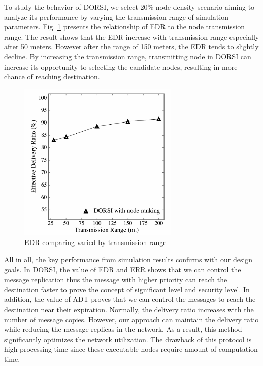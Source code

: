 To study the behavior of DORSI, we select 20\% node density scenario aiming to analyze its performance by varying the transmission range of simulation parameters. 
Fig. \ref{Fig:DORSI:EDR comparing varied by transmission range} presents the relationship of EDR to the node transmission range. 
The result shows that the EDR increase with transmission range especially after 50 meters. 
However after the range of 150 meters, the EDR tends to slightly decline. 
By increasing the transmission range, transmitting node in DORSI can increase its opportunity to selecting the candidate nodes, resulting in more chance of reaching destination.

\begin{figure}[!h]
\centering
\includegraphics[width=3in]{Graphs/EDRcomparingvariedbytransmissionrange.pdf}
\caption{EDR comparing varied by transmission range}
\label{Fig:DORSI:EDR comparing varied by transmission range}
\end{figure}

All in all, the key performance from simulation results confirms with our design goals. 
In DORSI, the value of EDR and ERR shows that we can control the message replication thus the message with higher priority can reach the destination faster to prove the concept of significant level and security level. 
In addition, the value of ADT proves that we can control the messages to reach the destination near their expiration. 
Normally, the delivery ratio increases with the number of message copies.
However, our approach can maintain the delivery ratio while reducing the message replicas in the network. 
As a result, this method significantly optimizes the network utilization. 
The drawback of this protocol is high processing time since these executable nodes require amount of computation time.

